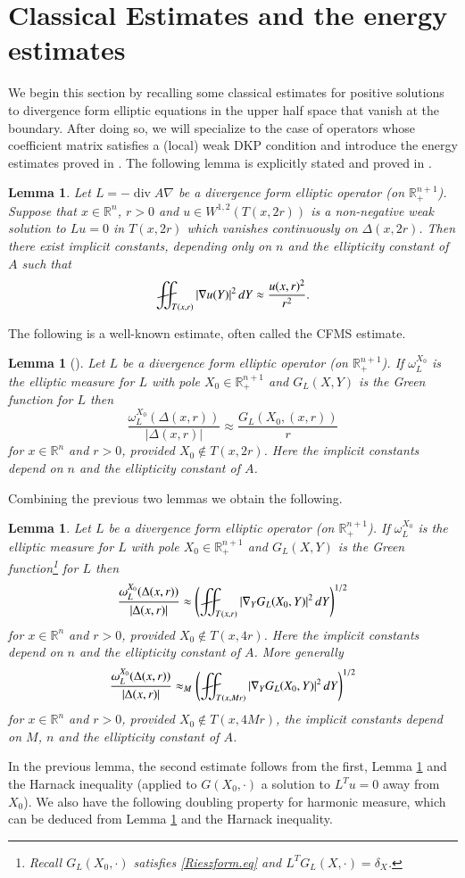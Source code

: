 \documentclass[11pt, a4paper,leqno]{amsart}
\def\Yint#1{\mathchoice
    {\YYint\displaystyle\textstyle{#1}}%
    {\YYint\textstyle\scriptstyle{#1}}%
    {\YYint\scriptstyle\scriptscriptstyle{#1}}%
    {\YYint\scriptscriptstyle\scriptscriptstyle{#1}}%
      \!\iint}
\def\YYint#1#2#3{{\setbox0=\hbox{$#1{#2#3}{\iint}$}
    \vcenter{\hbox{$#2#3$}}\kern-.51\wd0}}
\def\longdash{{-}\mkern-3.5mu{-}}
\def\tiltlongdash{\rotatebox[origin=c]{15}{$\longdash$}}
\def\fiint{\Yint\tiltlongdash}
\theoremstyle{plain}
\newtheorem{lemma}[equation]{Lemma}
\theoremstyle{definition}
\theoremstyle{remark}
\numberwithin{equation}{section}
\newcommand{\rn}{\mathbb{R}^n}
\newcommand{\ree}{\mathbb{R}^{n+1}}
\newcommand{\hm}{\omega}
\def\Yint#1{\mathchoice
    {\YYint\displaystyle\textstyle{#1}}%
    {\YYint\textstyle\scriptstyle{#1}}%
    {\YYint\scriptstyle\scriptscriptstyle{#1}}%
    {\YYint\scriptscriptstyle\scriptscriptstyle{#1}}%
      \!\iint}
\def\YYint#1#2#3{{\setbox0=\hbox{$#1{#2#3}{\iint}$}
    \vcenter{\hbox{$#2#3$}}\kern-.51\wd0}}
\def\longdash{{-}\mkern-3.5mu{--}}
\def\tiltlongdash{\rotatebox[origin=c]{15}{$\longdash$}}
\def\fiint{\Yint\tiltlongdash}
\def\div{\mathop{\operatorname{div}}\nolimits}
\begin{document}
\section{Classical Estimates and the \cite{DLM} energy estimates}\label{PDEDLM.sect}
We begin this section by recalling some classical estimates for positive solutions to divergence form elliptic equations in the upper half space that vanish at the boundary. After doing so, we will specialize to the case of operators whose coefficient matrix satisfies a (local) weak DKP condition and introduce the energy estimates proved in \cite{DLM}. The following lemma is explicitly stated and proved in \cite[Lemma 2.8]{DLM}.
\begin{lemma}\label{engcs.lem}
Let $L = -\div A \nabla$ be a divergence form elliptic operator (on $\ree_+$). Suppose that $x \in \rn$, $r > 0$ and $u \in W^{1,2}(T(x,2r))$  is a non-negative weak solution to $Lu = 0$ in $T(x,2r)$ which vanishes continuously on $\Delta(x,2r)$. Then there exist implicit constants, depending only on $n$ and the ellipticity constant of $A$ such that 
\[\fiint_{T(x,r)} |\nabla u(Y)|^2 \, dY \approx \frac{u(x,r)^2}{r^2}.\]
\end{lemma}

The following is a well-known estimate, often called the CFMS estimate.
\begin{lemma}[{\cite{CFMS}}]\label{CFMS.lem}
Let $L$ be a divergence form elliptic operator (on $\ree_+$). If $\hm^{X_0}_L$ is the elliptic measure for $L$ with pole $X_0 \in \ree_+$ and $G_L(X,Y)$ is the Green function for $L$ then
\[\frac{\hm^{X_0}_L(\Delta(x,r))}{|\Delta(x,r)|} \approx \frac{G_L(X_0, (x,r))}{r}\]
for $x \in \rn$ and $r > 0$, provided $X_0 \not\in T(x,2r)$. Here the implicit constants depend on $n$ and the ellipticity constant of $A$.
\end{lemma}

Combining the previous two lemmas we obtain the following.

\begin{lemma}\label{CFMSeng.lem}
Let $L$ be a divergence form elliptic operator (on $\ree_+$). If $\hm^{X_0}_L$ is the elliptic measure for $L$ with pole $X_0 \in \ree_+$ and $G_L(X,Y)$ is the Green function\footnote{Recall $G_L(X_0, \cdot)$ satisfies \eqref{Rieszform.eq} and $L^T G_L(X, \cdot) = \delta_X$.} for $L$  then
\[\frac{\hm^{X_0}_L(\Delta(x,r))}{|\Delta(x,r)|} \approx \left(\fiint_{T(x,r)} |\nabla_Y G_L(X_0, Y)|^2\, dY \right)^{1/2}\]
for $x \in \rn$ and $r > 0$, provided $X_0 \not\in T(x,4r)$. Here the implicit constants depend on $n$ and the ellipticity constant of $A$. More generally 
\[\frac{\hm^{X_0}_L(\Delta(x,r))}{|\Delta(x,r)|} \approx_M \left(\fiint_{T(x,Mr)} |\nabla_Y G_L(X_0, Y)|^2\, dY \right)^{1/2}\]
for $x \in \rn$ and $r > 0$, provided $X_0 \not\in T(x,4Mr)$, the implicit constants depend on $M$, $n$ and the ellipticity constant of $A$.
\end{lemma}
In the previous lemma, the second estimate follows from the first, Lemma \ref{engcs.lem} and the Harnack inequality (applied to $G(X_0,\cdot)$ a solution to $L^T u = 0$ away from $X_0$).  We also have the following doubling property for harmonic measure, which can be deduced from Lemma \ref{CFMS.lem} and the Harnack inequality. 
\end{document}
